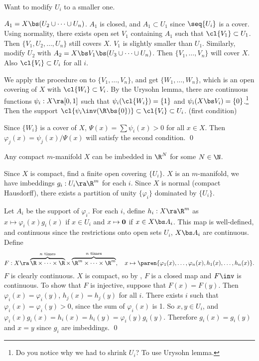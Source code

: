 \pf Want to modify \(U_i\) to a smaller one.

 \(A_1 = X \bs (U_2 \cup \cdots \cup U_n)\). \(A_1\) is closed, and \(A_1 \subset U_1\) since \(\seq{U_i}\) is a cover. Using normality, there exists open set \(V_1\) containing \(A_1\) such that \(\cl{V_1} \subset U_1\). Then \(\{V_1, U_2, \dots, U_n\}\) still covers \(X\). \(V_1\) is slightly smaller than \(U_1\). Similarly, modify \(U_2\) with \(A_2 = X \bs V_1 \bs (U_3 \cup \cdots \cup U_n)\). Then \(\{V_1, \dots, V_n\}\) will cover \(X\). Also \(\cl{V_i} \subset U_i\) for all \(i\).

 We apply the procedure on  to \(\{V_1, \dots, V_n\}\), and get \(\{W_1, \dots, W_n\}\), which is an open covering of \(X\) with \(\cl{W_i} \subset V_i\). By the Urysohn lemma, there are continuous functions \(\psi_i : X \ra [0, 1]\) such that \(\psi_i(\cl{W_i}) = \{1\}\) and \(\psi_i(X \bs V_i) = \{0\}\).\footnote{Do you notice why we had to shrink \(U_i\)? To use Urysohn lemma.} Then the support \(\cl{\psi_i\inv(\R \bs \{0\})} \subset \cl{V_i} \subset U_i\). (first condition)

Since \(\{W_i\}\) is a cover of \(X\), \(\Psi(x) = \sum \psi_i(x) > 0\) for all \(x \in X\). Then \(\varphi_j(x) = \psi_j(x) / \Psi(x)\) will satisfy the second condition. \qed

 Any compact \(m\)-manifold \(X\) can be imbedded in \(\R^N\) for some \(N \in \N\).

\pf Since \(X\) is compact, find a finite open covering \(\{U_i\}\). \(X\) is an \(m\)-manifold, we have imbeddings \(g_i : U_i \ra \R^m\) for each \(i\). Since \(X\) is normal (compact Hausdorff), there exists a partition of unity \(\{\varphi_i\}\) dominated by \(\{U_i\}\).

Let \(A_i\) be the support of \(\varphi_i\). For each \(i\), define \(h_i : X \ra \R^m\) as \(x \mapsto \varphi_i(x)g_i(x)\) if \(x \in U_i\) and \(x \mapsto \bf{0}\) if \(x \in X \bs A_i\). This map is well-defined, and continuous since the restrictions onto open sets \(U_i\), \(X \bs A_i\) are continuous. Define
\[
    F : X \ra \overbrace{\R \times \cdots \times \R}^{n \text{ times}} \times \overbrace{\R^m \times \cdots \times \R^m}^{n \text{ times}}, \quad x \mapsto \paren{\varphi_1(x), \dots, \varphi_n(x), h_1(x), \dots, h_n(x)}.
\]
\(F\) is clearly continuous. \(X\) is compact, so by , \(F\) is a closed map and \(F\inv\) is continuous. To show that \(F\) is injective, suppose that \(F(x) = F(y)\). Then \(\varphi_i(x) = \varphi_i(y)\), \(h_j(x) = h_j(y)\) for all \(i\). There exists \(i\) such that \(\varphi_i(x) = \varphi_i(y) > 0\), since the sum of \(\varphi_i(x)\) is 1. So \(x, y \in U_i\), and \(\varphi_i(x) g_i(x) = h_i(x) = h_i(y) = \varphi_i(y) g_i(y)\). Therefore \(g_i(x) = g_i(y)\) and \(x = y\) since \(g_i\) are imbeddings. \qed

